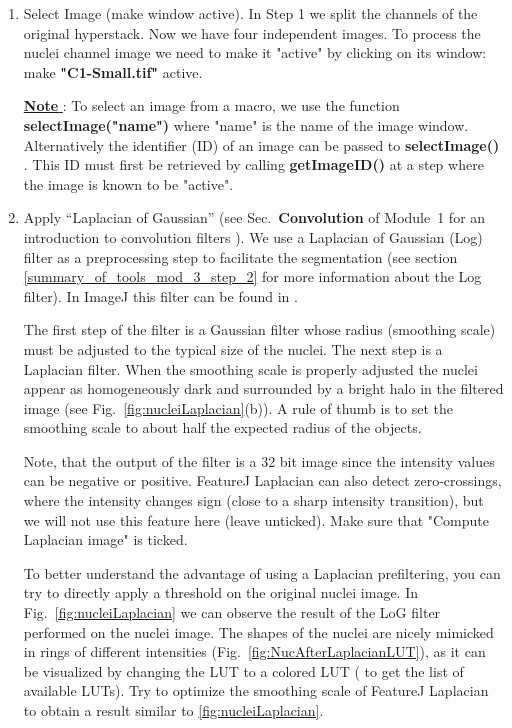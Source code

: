 \begin{enumerate}
    \item Select Image (make window active). 
    In Step 1 we split the channels of the original hyperstack. Now we have four independent images. To process the nuclei channel image we need to make it "active" by clicking on its window: make \textbf{"C1-Small.tif"} active.
    
    \underline{\textbf{Note} }: To select an image from a macro, we use the function \textbf{selectImage("name")} where "name" is the name of the image window. 
    Alternatively the identifier (ID) of an image can be passed to \textbf{selectImage()} . 
    This ID must first be retrieved by calling \textbf{getImageID()} at a step where the image is known to be "active".
\item Apply ``Laplacian of Gaussian'' (see Sec.~\textbf{Convolution} of Module~1 for an introduction to convolution filters ). We use a Laplacian of Gaussian (Log) filter as a preprocessing step to facilitate the segmentation (see section \ref{summary_of_tools_mod_3_step_2} for more information about the Log filter). In ImageJ this filter can be found in .
    
    The first step of the filter is a Gaussian filter whose radius (smoothing scale) must be adjusted to the typical size of the nuclei. The next step is a Laplacian filter. When the smoothing scale is properly adjusted the nuclei appear as homogeneously dark and surrounded by a bright halo in the filtered image (see Fig.~\ref{fig:nucleiLaplacian}(b)). A rule of thumb is to set the smoothing scale to about half the expected radius of the objects. 
    
    Note, that the output of the filter is a 32 bit image since the intensity values can be negative or positive. FeatureJ Laplacian can also detect zero-crossings, where the intensity changes sign (close to a sharp intensity transition), but we will not use this feature here (leave unticked). Make sure that "Compute Laplacian image" is ticked.
    
    To better understand the advantage of using a Laplacian prefiltering, you can try to directly apply a threshold on the original nuclei image.
In Fig.~\ref{fig:nucleiLaplacian} we can observe the result of the LoG filter performed on the nuclei image. The shapes of the nuclei are nicely mimicked in rings of different intensities (Fig.~\ref{fig:NucAfterLaplacianLUT}), as it can be visualized by changing the LUT to a colored LUT ( to get the list of available LUTs). Try to optimize the smoothing scale of FeatureJ Laplacian to obtain a result similar to \ref{fig:nucleiLaplacian}.


\end{enumerate}
